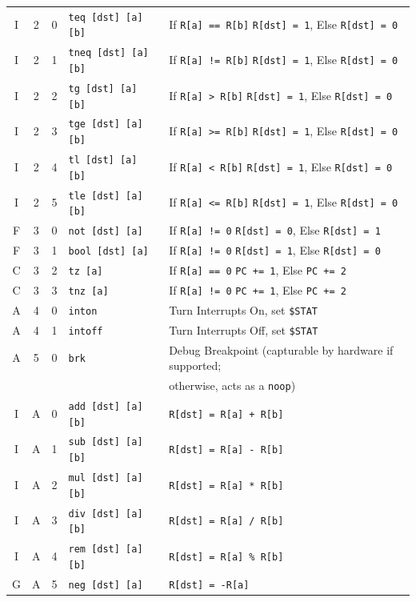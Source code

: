 \documentclass{article}
\begin{document}
\begin{table}[h!]
\begin{footnotesize}
\begin{tabular}{c|cc|l|l}
			I & 2 & 0 & \texttt{teq [dst] [a] [b]} & If \texttt{R[a] == R[b]} \texttt{R[dst] = 1}, Else \texttt{R[dst] = 0} \\
			I & 2 & 1 & \texttt{tneq [dst] [a] [b]} & If \texttt{R[a] != R[b]} \texttt{R[dst] = 1}, Else \texttt{R[dst] = 0} \\
			I & 2 & 2 & \texttt{tg [dst] [a] [b]} & If \texttt{R[a] > R[b]} \texttt{R[dst] = 1}, Else \texttt{R[dst] = 0} \\
			I & 2 & 3 & \texttt{tge [dst] [a] [b]} & If \texttt{R[a] >= R[b]} \texttt{R[dst] = 1}, Else \texttt{R[dst] = 0} \\
			I & 2 & 4 & \texttt{tl [dst] [a] [b]} & If \texttt{R[a] < R[b]} \texttt{R[dst] = 1}, Else \texttt{R[dst] = 0} \\
			I & 2 & 5 & \texttt{tle [dst] [a] [b]} & If \texttt{R[a] <= R[b]} \texttt{R[dst] = 1}, Else \texttt{R[dst] = 0} \\

			F & 3 & 0 & \texttt{not [dst] [a]} & If \texttt{R[a] != 0} \texttt{R[dst] = 0}, Else \texttt{R[dst] = 1} \\
			F & 3 & 1 & \texttt{bool [dst] [a]} & If \texttt{R[a] != 0} \texttt{R[dst] = 1}, Else \texttt{R[dst] = 0} \\
			C & 3 & 2 & \texttt{tz [a]} & If \texttt{R[a] == 0} \texttt{PC += 1}, Else \texttt{PC += 2} \\
			C & 3 & 3 & \texttt{tnz [a]} & If \texttt{R[a] != 0} \texttt{PC += 1}, Else \texttt{PC += 2} \\

			A & 4 & 0 & \texttt{inton} & Turn Interrupts On, set \texttt{\$STAT} \\
			A & 4 & 1 & \texttt{intoff} & Turn Interrupts Off, set \texttt{\$STAT} \\

			A & 5 & 0 & \texttt{brk} & Debug Breakpoint (capturable by hardware if supported; \\
			{} & {} & {} & {} & otherwise, acts as a \texttt{noop}) \\

			I & A & 0 & \texttt{add [dst] [a] [b]} & \texttt{R[dst] = R[a] + R[b]} \\
			I & A & 1 & \texttt{sub [dst] [a] [b]} & \texttt{R[dst] = R[a] - R[b]} \\
			I & A & 2 & \texttt{mul [dst] [a] [b]} & \texttt{R[dst] = R[a] * R[b]} \\
			I & A & 3 & \texttt{div [dst] [a] [b]} & \texttt{R[dst] = R[a] / R[b]} \\
			I & A & 4 & \texttt{rem [dst] [a] [b]} & \texttt{R[dst] = R[a] \% R[b]} \\
			G & A & 5 & \texttt{neg [dst] [a]} & \texttt{R[dst] = -R[a]} \\


\end{tabular}
\end{footnotesize}
\end{table}
\end{document}
